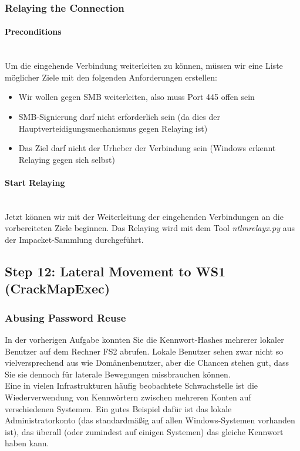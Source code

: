 \subsubsection{Relaying the Connection}

\paragraph{Preconditions}\mbox{} \\

Um die eingehende Verbindung weiterleiten zu können, müssen wir eine Liste möglicher Ziele mit den folgenden Anforderungen erstellen:

\begin{itemize}
    \item Wir wollen gegen SMB weiterleiten, also muss Port 445 offen sein
    \item SMB-Signierung darf nicht erforderlich sein (da dies der Hauptverteidigungsmechanismus gegen Relaying ist)
    \item Das Ziel darf nicht der Urheber der Verbindung sein (Windows erkennt Relaying gegen sich selbst)
\end{itemize}

\paragraph{Start Relaying}\mbox{} \\
Jetzt können wir mit der Weiterleitung der eingehenden Verbindungen an die vorbereiteten Ziele beginnen. Das Relaying wird mit dem Tool \textcolor{OSTPink}{\textit{ntlmrelayx.py}} aus der Impacket-Sammlung durchgeführt.

\subsection{Step 12: Lateral Movement to WS1 (CrackMapExec)}

\subsubsection{Abusing Password Reuse}
In der vorherigen Aufgabe konnten Sie die Kennwort-Hashes mehrerer lokaler Benutzer auf dem Rechner FS2 abrufen. Lokale Benutzer sehen zwar nicht so vielversprechend aus wie Domänenbenutzer, aber die Chancen stehen gut, dass Sie sie dennoch für laterale Bewegungen missbrauchen können.\\

Eine in vielen Infrastrukturen häufig beobachtete Schwachstelle ist die Wiederverwendung von Kennwörtern zwischen mehreren Konten auf verschiedenen Systemen. Ein gutes Beispiel dafür ist das lokale Administratorkonto (das standardmäßig auf allen Windows-Systemen vorhanden ist), das überall (oder zumindest auf einigen Systemen) das gleiche Kennwort haben kann.\\

